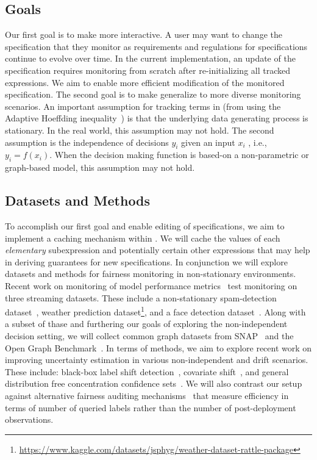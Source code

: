 \subsection{Goals}
Our first goal is to make \AVOIRmethodname{} more interactive.
A user may want to change the specification that they monitor as requirements and regulations for specifications continue to evolve over time.
In the current implementation, an update of the specification requires monitoring from scratch after re-initializing all tracked expressions.
 We aim to enable more efficient modification of the monitored specification.  
The second goal is to make \AVOIRmethodname{} generalize to more diverse monitoring scenarios.
An important assumption for tracking terms in \AVOIRmethodname{} (from using the Adaptive Hoeffding inequality~\cite{zhao2016adaptive}) is that the underlying data generating process is stationary.
In the real world, this assumption may not hold.
The second assumption is the independence of decisions $y_i$ given an input $x_i$ , i.e., $y_i = f(x_i)$.
When the decision making function is based-on a non-parametric or graph-based model, this assumption may not hold.


\subsection{Datasets and Methods}
To accomplish our first goal and enable editing of specifications, we aim to implement a caching mechanism within \AVOIRmethodname{}.
We will cache the values of each \textit{elementary} subexpression and potentially certain other expressions that may help in deriving guarantees for new specifications.
In conjunction we will explore datasets and methods for fairness monitoring in non-stationary environments.
Recent work on monitoring of model performance metrics~\cite{ginart2022mldemon} test monitoring on three streaming datasets.
These include a non-stationary spam-detection dataset~\cite{katakis2005utility}, weather prediction dataset\footnote{\url{https://www.kaggle.com/datasets/jsphyg/weather-dataset-rattle-package}}, and a face detection dataset~\cite{wang2020masked}.
Along with a subset of thase and furthering our goals of exploring the non-independent decision setting, we will collect common graph datasets from SNAP~\cite{snapnets} and the Open Graph Benchmark~\cite{hu2020open}.
In terms of methods, we aim to explore recent work on improving uncertainty estimation in various non-independent and drift scenarios.
These include: black-box label shift detection~\cite{lipton2018detecting}, covariate shift~\cite{tibshirani2019conformal}, and general distribution free concentration confidence sets~\cite{howard2021time}. 
We will also contrast our setup against alternative fairness auditing mechanisms~\cite{yan2022active} that measure efficiency in terms of number of queried labels rather than the number of post-deployment observations. 

